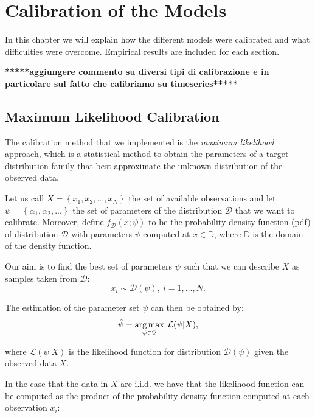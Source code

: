 \chapter{Calibration of the Models}
\label{chpr:calibration}

In this chapter we will explain how the different models were calibrated and what difficulties were overcome. Empirical results are included for each section.

\textbf{*****aggiungere commento su diversi tipi di calibrazione e in particolare sul fatto che calibriamo su timeseries*****}
\bigskip

\section{Maximum Likelihood Calibration}
\label{sec:calib_overview}
The calibration method that we implemented is the \textit{maximum likelihood} approach, which is a statistical method to obtain the parameters of a target distribution family that best approximate the unknown distribution of the observed data.

Let us call $X = \left\lbrace x_1, x_2, ... , x_N \right\rbrace$ the set of available observations and let $\psi= \left\lbrace \alpha_1, \alpha_2, ... \right\rbrace $ the set of parameters of the distribution $ \mathcal{D}$ that we want to calibrate.
Moreover, define $f_\mathcal{D} (x ; \psi)$ to be the probability density function (pdf) of distribution $\mathcal{D}$ with parameters $\psi$ computed at $x \in \mathbb{D}$, where $\mathbb{D}$ is the domain of the density function.

Our aim is to find the best set of parameters $\psi$ such that we can describe $X$ as samples taken from $\mathcal{D}$:
\begin{equation}
x_i \sim \mathcal{D} (\psi), \: i = 1, \dots, N.
\end{equation}

The estimation of the parameter set $\psi$ can then be obtained by:
\begin{equation}
	\hat{\psi} = \operatorname*{arg\,max}_{\psi \in \Psi} \:\mathcal{L}(\psi |  X),
\end{equation}

where $\mathcal{L}(\psi |  X)$ is the likelihood function for distribution $\mathcal{D}(\psi)$ given the observed data $X$.

In the case that the data in $X$ are i.i.d. we have that the likelihood function can be computed as the product of the probability density function computed at each observation $x_i$:

